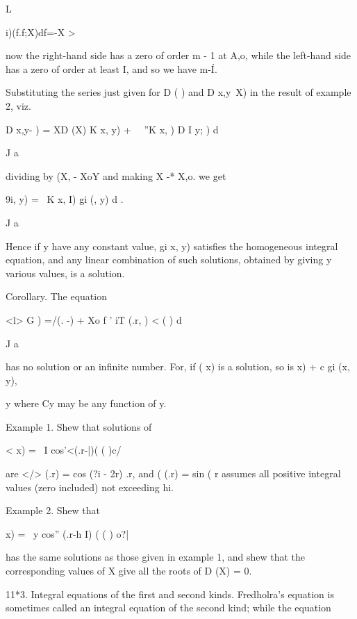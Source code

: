 L

i)(f.f;X)df=-X >

now the right-hand side has a zero of order m - 1 at A,o, while the
left-hand side has a zero of order at least I, and so we have m-\' I.

Substituting the series just given for D ( ) and D x,y\ X) in the
result of example 2, viz.

D x,y- ) = XD (X) K x, y) + \ \ ''K x, ) D I y; ) d

J a

dividing by (X, - XoY and making X -* X,o. we get

9i, y) = \ K x, I) gi (, y) d .

J a

Hence if y have any constant value, gi x, y) satisfies the homogeneous
integral equation, and any linear combination of such solutions,
obtained by giving y various values, is a solution.

Corollary. The equation

<l> G ) =/(. -) + Xo f ' iT (.r, ) < ( ) d

J a

has no solution or an infinite number. For, if ( x) is a solution, so
is x) + c gi (x, y),

y where Cy may be any function of y.

Example 1. Shew that solutions of

< x) = \ I cos'<(.r-|)( ( )c/

are </> (.r) = cos (?i - 2r) .r, and ( (.r) = sin (%
r assumes all positive integral values (zero included) not exceeding
hi.

Example 2. Shew that

  x) = \ y cos'' (.r-h I) ( ( ) o?|

has the same solutions as those given in example 1, and shew that the
corresponding values of X give all the roots of D (X) = 0.

%
%

11*3. Integral equations of the first and second kinds. Fredholra's
equation is sometimes called an integral equation of the second kind;
while the equation

